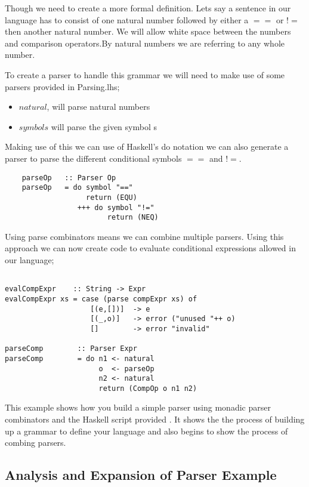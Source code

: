 Though we need to create a more formal definition. Lets say a sentence in our language has to consist of one natural number followed by either a $==$ or $!=$ then another natural number. We will allow white space between the numbers and comparison operators.By natural numbers we are referring to any whole number. 

To create a parser to handle this grammar we will need to make use of some parsers provided in Parsing.lhs;

\begin{itemize}
\item $natural$, will parse natural numbers
\item $symbol s$ will parse the given symbol s 
\end{itemize}

Making use of this we can use of Haskell's do notation we can also generate a parser to parse the different conditional symbols $==$ and $!=$. 

\begin{lstlisting}
	parseOp   :: Parser Op
	parseOp   = do symbol "=="
	               return (EQU)
        	     +++ do symbol "!="
	                    return (NEQ) 
\end{lstlisting} 

\newpage

Using parse combinators means we can combine multiple parsers. Using this approach we can now create code to evaluate conditional expressions allowed in our language;

\begin{lstlisting}

evalCompExpr    :: String -> Expr
evalCompExpr xs = case (parse compExpr xs) of
                    [(e,[])]  -> e
                    [(_,o)]   -> error ("unused "++ o)
                    []        -> error "invalid"

parseComp        :: Parser Expr	
parseComp        = do n1 <- natural
                      o  <- parseOp 
                      n2 <- natural
                      return (CompOp o n1 n2)  
\end{lstlisting}

This example shows how you build a simple parser using monadic parser combinators and the Haskell script provided %
. It shows the the process of building up a grammar to define your language and also begins to show the process of combing parsers. 


\subsection{Analysis and Expansion of Parser Example}

